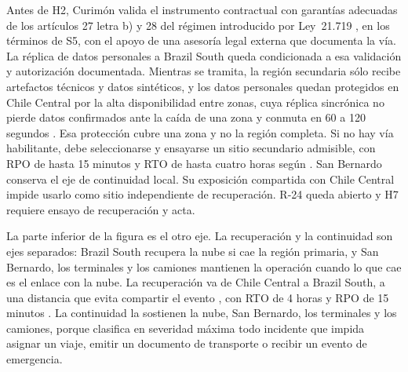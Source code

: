 Antes de H2, Curimón valida el instrumento contractual con garantías adecuadas de los artículos 27 letra b) y 28 del régimen introducido por Ley~21.719 \parencite{d3_ley21719}, en los términos de S5, con el apoyo de una asesoría legal externa que documenta la vía. La réplica de datos personales a Brazil South queda condicionada a esa validación y autorización documentada. Mientras se tramita, la región secundaria sólo recibe artefactos técnicos y datos sintéticos, y los datos personales quedan protegidos en Chile Central por la alta disponibilidad entre zonas, cuya réplica sincrónica no pierde datos confirmados ante la caída de una zona y conmuta en 60 a 120 segundos \parencite{ms_pg_confiabilidad}. Esa protección cubre una zona y no la región completa. Si no hay vía habilitante, debe seleccionarse y ensayarse un sitio secundario admisible, con RPO de hasta 15 minutos y RTO de hasta cuatro horas según . San Bernardo conserva el eje de continuidad local. Su exposición compartida con Chile Central impide usarlo como sitio independiente de recuperación. R-24 queda abierto y H7 requiere ensayo de recuperación y acta.

La parte inferior de la figura es el otro eje. La recuperación y la continuidad son ejes separados:
Brazil South recupera la nube si cae la región primaria, y San Bernardo, los terminales y los camiones
mantienen la operación cuando lo que cae es el enlace con la nube. La recuperación va de Chile Central a Brazil South, a una distancia que evita
compartir el evento , con RTO de 4 horas y RPO de 15 minutos
. La continuidad la sostienen la nube, San Bernardo, los terminales y los
camiones, porque  clasifica en severidad máxima todo incidente que impida asignar un
viaje, emitir un documento de transporte o recibir un evento de emergencia.

